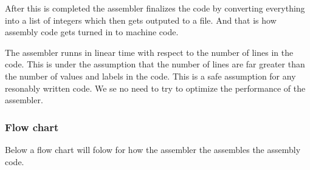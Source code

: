 \documentclass{article}
\begin{document}
After this is completed the assembler finalizes the code by converting
everything into a list of integers which then gets outputed to a file. And that
is how assembly code gets turned in to machine code.

The assembler runns in linear time with respect to the number of lines in the
code. This is under the assumption that the number of lines are far greater than
the number of values and labels in the code. This is a safe assumption for any
resonably written code. We se no need to try to optimize the performance of the
assembler.

\subsubsection{Flow chart}
Below a flow chart will folow for how the assembler the assembles the
assembly code.
 
\end{document}
